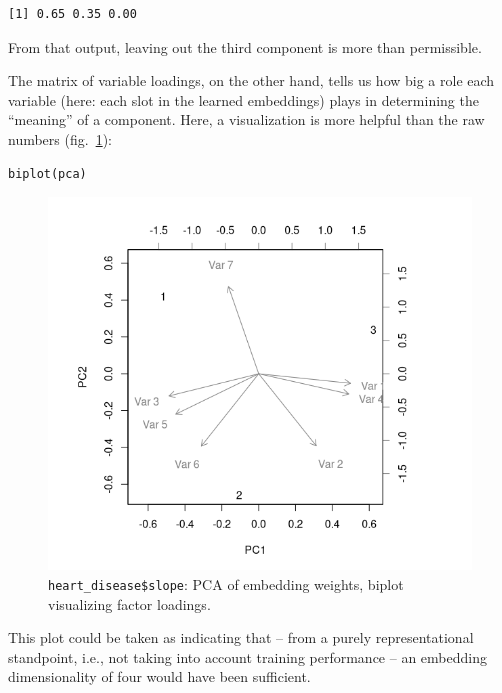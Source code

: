 \documentclass[
  letterpaper,
]{krantz}
\begin{document}
\begin{verbatim}
[1] 0.65 0.35 0.00
\end{verbatim}

From that output, leaving out the third component is more than
permissible.

The matrix of variable loadings, on the other hand, tells us how big a
role each variable (here: each slot in the learned embeddings) plays in
determining the ``meaning'' of a component. Here, a visualization is
more helpful than the raw numbers
(fig.~\ref{fig-tabular-heart-disease-biplot}):

\begin{verbatim}
biplot(pca)
\end{verbatim}

\begin{figure}[H]

{\centering \includegraphics{images/tabular-heart-disease-biplot.png}

}

\caption{\label{fig-tabular-heart-disease-biplot}\texttt{heart\_disease\$slope}:
PCA of embedding weights, biplot visualizing factor loadings.}

\end{figure}

This plot could be taken as indicating that -- from a purely
representational standpoint, i.e., not taking into account training
performance -- an embedding dimensionality of four would have been
sufficient.
\end{document}
